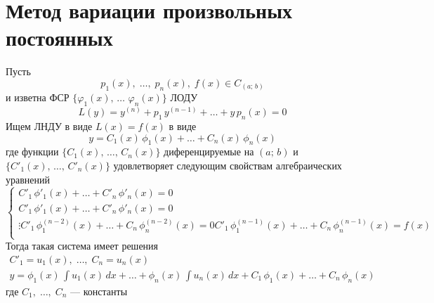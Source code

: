 \author{Tkachuk Andrei}

\section{Метод вариации произвольных постоянных}

\begin{Th}
    Пусть 
    \[
        p_1(x),\; \dots,\; p_n(x),\; f(x) \in C_{(a;\,b)}
    \]
    и изветна ФСР $\{\varphi_1(x),\, \dots\,\, \varphi_n(x)\}$ ЛОДУ
    \[
        L(y) = y^{(n)} + p_1\,y^{(n-1)} + \dots + y\,p_n(x) = 0
    \]
    Ищем ЛНДУ в виде $L(x) = f(x)$ в виде 
    \[
        y = C_1(x)\,\phi_1(x) + \dots + C_n(x)\,\phi_n(x)
    \]
    где функции $\{C_1(x),\, \dots,\, C_n(x)\}$ диференцируемые на $(a;\, b)$
    и $\{C'_1(x),\, \dots,\, C'_n(x)\}$ удовлетворяет следующим свойствам алгебраических уравнений
    \[
        \begin{cases}
            C'_1\,\phi'_1(x) + \dots + C'_n\,\phi'_n(x) = 0\\
            C'_1\,\phi'_1(x) + \dots + C'_n\,\phi'_n(x) = 0\\
            \vdots
            C'_1\,\phi^{(n-2)}_1(x) + \dots + C_n\,\phi^{(n-2)}_n(x) = 0
            C'_1\,\phi^{(n-1)}_1(x) + \dots + C_n\,\phi^{(n-1)}_n(x) = f(x)\\
        \end{cases}
    \]
    Тогда такая система имеет решения
    \begin{gather*}
        C'_1 = u_1(x),\; \dots,\; C_n = u_n(x)\\
        y = \phi_1(x)\, \int u_1(x)\,dx + \dots + \phi_n(x)\, \int u_n(x)\,dx + C_1\,\phi_1(x) + \dots + C_n\,\phi_n(x)
    \end{gather*}
    где $C_1,\; \dots,\; C_n$ --- константы
\end{Th}

